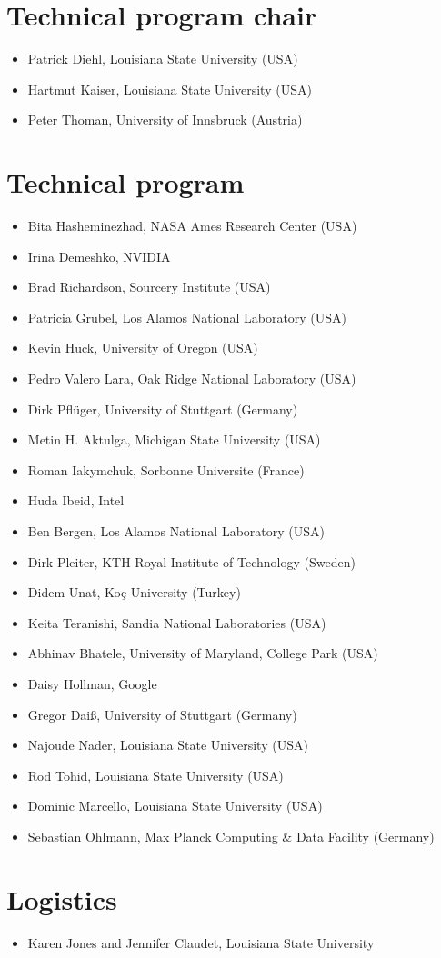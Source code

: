 \section*{Technical program chair}

\begin{itemize}
\item Patrick Diehl, Louisiana State University (USA)
\item Hartmut Kaiser, Louisiana State University (USA)
\item Peter Thoman, University of Innsbruck (Austria)
\end{itemize}

\section*{Technical program }

\begin{itemize}
\item Bita Hasheminezhad, NASA Ames Research Center (USA)
\item Irina Demeshko, NVIDIA
\item Brad Richardson, Sourcery Institute (USA)
\item Patricia Grubel, Los Alamos National Laboratory (USA)
\item Kevin Huck, University of Oregon (USA)
\item Pedro Valero Lara, Oak Ridge National Laboratory (USA)
\item Dirk Pflüger, University of Stuttgart (Germany)
\item Metin H. Aktulga, Michigan State University (USA)
\item Roman Iakymchuk, Sorbonne Universite (France)
\item Huda Ibeid, Intel
\item Ben Bergen, Los Alamos National Laboratory (USA)
\item Dirk Pleiter, KTH Royal Institute of Technology (Sweden)
\item Didem Unat, Koç University (Turkey)
\item Keita Teranishi, Sandia National Laboratories (USA)
\item Abhinav Bhatele, University of Maryland, College Park (USA)
\item Daisy Hollman, Google
\item Gregor Daiß, University of Stuttgart (Germany)
\item Najoude Nader, Louisiana State University (USA)
\item Rod Tohid, Louisiana State University (USA)
\item Dominic Marcello, Louisiana State University (USA)
\item Sebastian Ohlmann, Max Planck Computing \& Data Facility (Germany)
\end{itemize}


\section*{Logistics}
\begin{itemize}
\item Karen Jones and Jennifer Claudet, Louisiana State University
\end{itemize}
